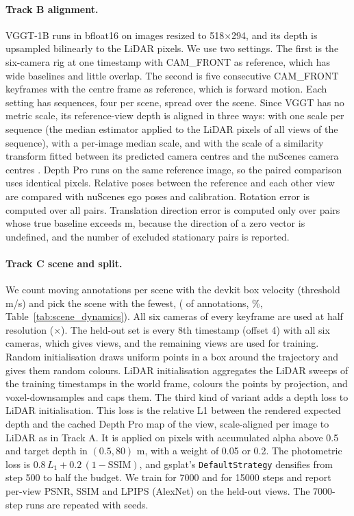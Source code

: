 \documentclass[10pt]{article}
\begin{document}
\paragraph{Track B alignment.}
VGGT-1B \citep{wang2025vggt} runs in bfloat16 on images resized to 518$\times$294, and its depth is
upsampled bilinearly to the LiDAR pixels. We use two settings. The first is the six-camera rig at one
timestamp with CAM\_FRONT as reference, which has wide baselines and little overlap. The second is five
consecutive CAM\_FRONT keyframes with the centre frame as reference, which is forward motion. Each setting
has \BRignSeq{} sequences, four per scene, spread over the scene. Since VGGT has no metric scale, its
reference-view depth is aligned in three ways: with one scale per sequence (the median estimator applied to
the LiDAR pixels of all views of the sequence), with a per-image median scale, and with the scale of a
similarity transform fitted between its predicted camera centres and the nuScenes camera centres
\citep{umeyama1991}. Depth Pro runs on the same reference image, so the paired comparison uses identical
pixels. Relative poses between the reference and each other view are compared with nuScenes ego poses and
calibration. Rotation error is computed over all pairs. Translation direction error is computed only over
pairs whose true baseline exceeds \BTempminBaseline{} m, because the direction of a zero vector is
undefined, and the number of excluded stationary pairs is reported.

\paragraph{Track C scene and split.}
We count moving annotations per scene with the devkit box velocity (threshold \DynVelThreshold{} m/s) and
pick the scene with the fewest, \GSscene{} (\GSsceneMoving{} of \GSsceneAnnotations{} annotations,
\GSsceneFracMoving\%, Table~\ref{tab:scene_dynamics}). All six cameras of every keyframe are used at half
resolution (\GSimageW$\times$\GSimageH). The held-out set is every 8th timestamp (offset 4) with all six
cameras, which gives \GStestViews{} views, and the remaining \GStrainViews{} views are used for training.
Random initialisation draws uniform points in a box around the trajectory and gives them random colours.
LiDAR initialisation aggregates the LiDAR sweeps of the training timestamps in the world frame, colours the
points by projection, and voxel-downsamples and caps them. The third kind of variant adds a depth loss to
LiDAR initialisation. This loss is the relative L1 between the rendered expected depth and the cached Depth
Pro map of the view, scale-aligned per image to LiDAR as in Track A. It is applied on pixels with
accumulated alpha above 0.5 and target depth in $(0.5, 80)$ m, with a weight of 0.05 or 0.2. The
photometric loss is $0.8\,L_1 + 0.2\,(1 - \mathrm{SSIM})$, and gsplat's \texttt{DefaultStrategy} densifies
from step 500 to half the budget. We train for 7000 and for 15000 steps and report per-view PSNR, SSIM and
LPIPS (AlexNet) on the held-out views. The 7000-step runs are repeated with \GSnSeeds{} seeds.
\end{document}
